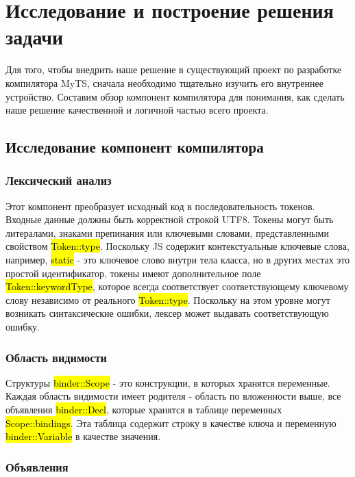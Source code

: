\section{Исследование и построение решения задачи}
\label{sec:Chapter3} 

Для того, чтобы внедрить наше решение в существующий проект по разработке компилятора MyTS,
сначала необходимо тщательно изучить его внутреннее устройство.
Составим обзор компонент компилятора для понимания, как сделать наше решение качественной и логичной частью всего проекта.

\subsection{Исследование компонент компилятора}

\subsubsection{Лексический анализ}

Этот компонент преобразует исходный код в последовательность токенов.
Входные данные должны быть корректной строкой UTF8.
Токены могут быть литералами, знаками препинания или ключевыми словами, представленными свойством \hl{Token::type}.
Поскольку JS содержит контекстуальные ключевые слова, например, \hl{static} - это ключевое слово внутри тела класса,
но в других местах это простой идентификатор, токены имеют дополнительное поле \hl{Token::keywordType},
которое всегда соответствует соответствующему ключевому слову независимо от реального \hl{Token::type}.
Поскольку на этом уровне могут возникать синтаксические ошибки, лексер может выдавать соответствующую ошибку.

\subsubsection{Область видимости}

Структуры \hl{binder::Scope} - это конструкции, в которых хранятся переменные.
Каждая область видимости имеет родителя - область по вложенности выше, все объявления \hl{binder::Decl},
которые хранятся в таблице переменных \hl{Scope::bindings}.
Эта таблица содержит строку в качестве ключа и переменную \hl{binder::Variable} в качестве значения.

\subsubsection{Объявления}

